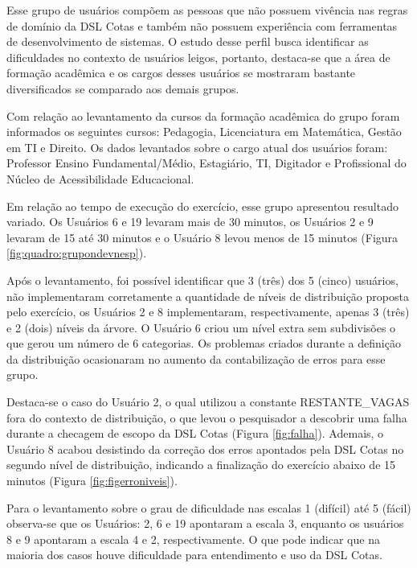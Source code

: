Esse grupo de usuários compõem as pessoas que não possuem vivência nas regras de domínio da DSL Cotas e também não possuem experiência com ferramentas de desenvolvimento de sistemas. O estudo desse perfil busca identificar as dificuldades no contexto de usuários leigos, portanto, destaca-se que a área de formação acadêmica e os cargos desses usuários se mostraram bastante diversificados se comparado aos demais grupos.

Com relação ao levantamento da cursos da formação acadêmica do grupo foram informados os seguintes cursos: Pedagogia, Licenciatura em Matemática, Gestão em TI e Direito. Os dados levantados sobre o cargo atual dos usuários foram: Professor Ensino Fundamental/Médio, Estagiário, TI, Digitador e Profissional do Núcleo de Acessibilidade Educacional.

Em relação ao tempo de execução do exercício, esse grupo apresentou resultado variado. Os Usuários 6 e 19 levaram mais de 30 minutos, os Usuários 2 e 9 levaram de 15 até 30 minutos e o Usuário 8 levou menos de 15 minutos (Figura \ref{fig:quadro:grupondevnesp}). 



Após o levantamento, foi possível identificar que 3 (três) dos 5 (cinco) usuários, não implementaram corretamente a quantidade de níveis de distribuição proposta pelo exercício, os Usuários 2 e 8 implementaram, respectivamente, apenas 3 (três) e 2 (dois) níveis da árvore. O Usuário 6 criou um nível extra sem subdivisões o que gerou um número de 6 categorias. Os problemas criados durante a definição da distribuição ocasionaram no aumento da contabilização de erros para esse grupo. 

Destaca-se o caso do Usuário 2, o qual utilizou a constante RESTANTE\_VAGAS fora do contexto de distribuição, o que levou o pesquisador a descobrir uma falha durante a checagem de escopo da DSL Cotas (Figura \ref{fig:falha}). Ademais, o Usuário 8 acabou desistindo da correção dos erros apontados pela DSL Cotas no segundo nível de distribuição, indicando a finalização do exercício abaixo de 15 minutos (Figura \ref{fig:figerroniveis}).





\newpage
Para o levantamento sobre o grau de dificuldade nas escalas 1 (difícil) até 5 (fácil) observa-se que os Usuários: 2, 6 e 19 apontaram a escala 3, enquanto os usuários 8 e 9 apontaram a escala 4 e 2, respectivamente. O que pode indicar que na maioria dos casos houve dificuldade para entendimento e uso da DSL Cotas.

